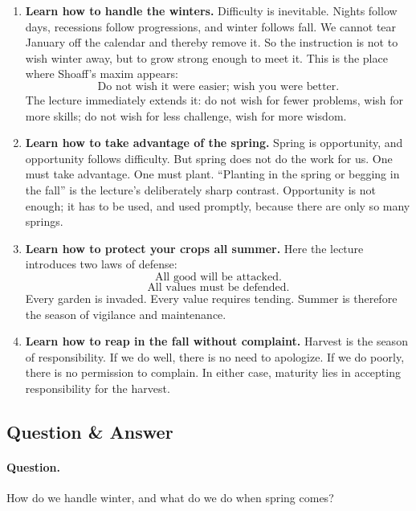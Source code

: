 \begin{enumerate}
\item \textbf{Learn how to handle the winters.} Difficulty is inevitable. Nights follow days, recessions follow progressions, and winter follows fall. We cannot tear January off the calendar and thereby remove it. So the instruction is not to wish winter away, but to grow strong enough to meet it. This is the place where Shoaff's maxim appears:
\begin{equation}
\text{Do not wish it were easier; wish you were better.}
\end{equation}
The lecture immediately extends it: do not wish for fewer problems, wish for more skills; do not wish for less challenge, wish for more wisdom.

\item \textbf{Learn how to take advantage of the spring.} Spring is opportunity, and opportunity follows difficulty. But spring does not do the work for us. One must take advantage. One must plant. ``Planting in the spring or begging in the fall'' is the lecture's deliberately sharp contrast. Opportunity is not enough; it has to be used, and used promptly, because there are only so many springs.

\item \textbf{Learn how to protect your crops all summer.} Here the lecture introduces two laws of defense:
\begin{equation}
\text{All good will be attacked.}
\end{equation}
\begin{equation}
\text{All values must be defended.}
\end{equation}
Every garden is invaded. Every value requires tending. Summer is therefore the season of vigilance and maintenance.

\item \textbf{Learn how to reap in the fall without complaint.} Harvest is the season of responsibility. If we do well, there is no need to apologize. If we do poorly, there is no permission to complain. In either case, maturity lies in accepting responsibility for the harvest.
\end{enumerate}

\subsection{Question \& Answer}

\paragraph{Question.} How do we handle winter, and what do we do when spring comes?


